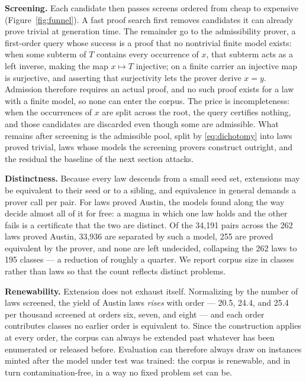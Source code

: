 \textbf{Screening.} Each candidate then passes screens ordered from cheap to
expensive (Figure~\ref{fig:funnel}). A fast proof search first removes
candidates it can already prove trivial at generation time. The remainder go
to the admissibility prover, a first-order query whose success is a proof that
no nontrivial finite model exists: when some subterm of $T$ contains every
occurrence of $x$, that subterm acts as a left inverse, making the map
$x \mapsto T$ injective; on a finite carrier an injective map is surjective,
and asserting that surjectivity lets the prover derive $x = y$. Admission
therefore requires an actual proof, and no such proof exists for a law with a
finite model, so none can enter the corpus. The price is incompleteness: when
the occurrences of $x$ are split across the root, the query certifies nothing,
and those candidates are discarded even though some are admissible. What
remains after screening is the admissible pool, split by
\eqref{eq:dichotomy} into laws proved trivial, laws whose models the screening
provers construct outright, and the residual the baseline of the next section
attacks.

\textbf{Distinctness.} Because every law descends from a small seed set,
extensions may be equivalent to their seed or to a sibling, and equivalence in
general demands a prover call per pair. For laws proved Austin, the models
found along the way decide almost all of it for free: a magma in which one law
holds and the other fails is a certificate that the two are distinct. Of the
34{,}191 pairs across the 262 laws proved Austin, 33{,}936 are separated by
such a model, 255 are proved equivalent by the prover, and none are left
undecided, collapsing the 262 laws to 195 classes — a reduction of roughly a
quarter. We report corpus size in classes rather than laws so that the count
reflects distinct problems.

\textbf{Renewability.} Extension does not exhaust itself. Normalizing by the
number of laws screened, the yield of Austin laws \emph{rises} with order —
20.5, 24.4, and 25.4 per thousand screened at orders six, seven, and eight —
and each order contributes classes no earlier order is equivalent to.
Since the construction applies at every order, the corpus can always be
extended past whatever has been enumerated or released before. Evaluation can
therefore always draw on instances minted after the model under test was
trained: the corpus is renewable, and in turn contamination-free, in a way no
fixed problem set can be.

